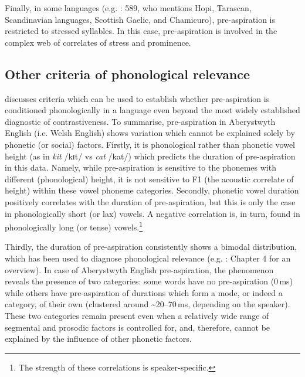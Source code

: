 \documentclass[output=paper]{langscibook}
\begin{document}
Finally, in some languages (e.g. \citealt{Silverman2003}: 589, who mentions Hopi, Tarascan, Scandinavian languages, Scottish Gaelic, and Chamicuro), pre\hyp aspiration is restricted to stressed syllables. In this case, pre\hyp aspiration is involved in the complex web of correlates of stress and prominence.

\subsection{Other criteria of phonological relevance}\label{sec:hejna:3.5}

\textcites[Ch. 4]{Hejná2015}{Hejná2019} discusses criteria which can be used to establish whether pre\hyp aspiration is conditioned phonologically in a language even beyond the most widely established diagnostic of contrastiveness. To summarise, pre\hyp aspiration in Aberystwyth English (i.e. Welsh English) shows variation which cannot be explained solely by phonetic (or social) factors. Firstly, it is phonological rather than phonetic vowel height (as in \textit{kit} /kɪt/ vs \textit{cat} /kat/) which predicts the duration of pre\hyp aspiration in this data. Namely, while pre\hyp aspiration is sensitive to the phonemes with different (phonological) height, it is not sensitive to F1 (the acoustic correlate of height) within these vowel phoneme categories. Secondly, phonetic vowel duration positively correlates with the duration of pre-aspiration, but this is only the case in phonologically short (or lax) vowels. A negative correlation is, in turn, found in phonologically long (or tense) vowels.\footnote{The strength of these correlations is speaker-specific.} 

Thirdly, the duration of pre\hyp aspiration consistently shows a bimodal distribution, which has been used to diagnose phonological relevance (e.g. \citealt{Hejná2015}: Chapter 4 for an overview). In case of Aberystwyth English pre-aspiration, the phenomenon reveals the presence of two categories: some words have no pre\hyp aspiration (0\,ms) while others have pre\hyp aspiration of durations which form a mode, or indeed a category, of their own (clustered around {\textasciitilde}20--70\,ms, depending on the speaker). These two categories remain present even when a relatively wide range of segmental and prosodic factors is controlled for, and, therefore, cannot be explained by the influence of other phonetic factors.
\end{document}
